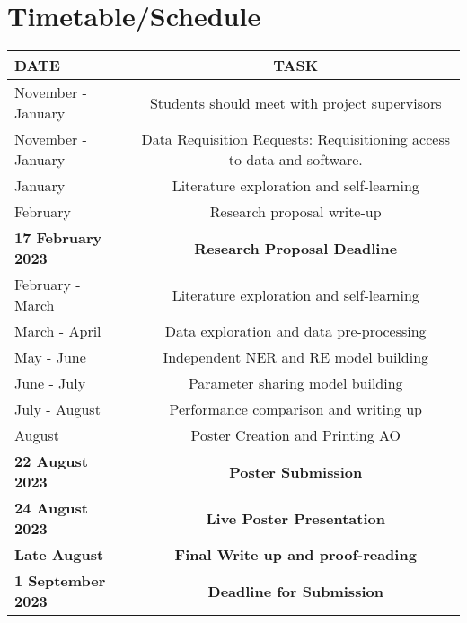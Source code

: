 \documentclass{article}
\begin{document}
\section{Timetable/Schedule}

\begin{center}
\begin{table}
\centering
\begin{tabular}{|l|c|}
\hline
DATE & TASK \\
\hline
November - January & Students should meet with project supervisors \\\hline
November - January & Data Requisition Requests: Requisitioning access to data and software. \\\hline
January	& Literature exploration and self-learning \\\hline
February & Research proposal write-up \\\hline
\textbf{17 February 2023} & \textbf{Research Proposal Deadline} \\\hline
February - March & Literature exploration and self-learning \\\hline
March - April & Data exploration and data pre-processing \\\hline
May - June & Independent NER and RE model building \\\hline
June - July & Parameter sharing model building \\\hline
July - August & Performance comparison and writing up \\\hline
August & Poster Creation and Printing AO \\\hline
\textbf{22 August 2023} & \textbf{Poster Submission} \\\hline
\textbf{24 August 2023} & \textbf{Live Poster Presentation} \\\hline
\textbf{Late August} & \textbf{Final Write up and proof-reading} \\\hline
\textbf{1 September 2023} & \textbf{Deadline for Submission} \\
\hline

\end{tabular}
\end{table}
\end{center}





\end{document}
